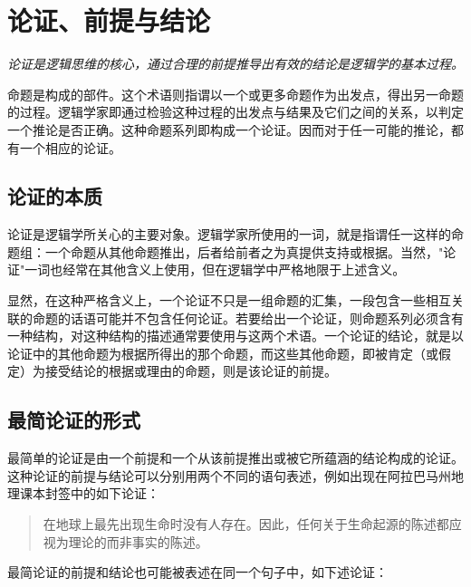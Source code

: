 \section{论证、前提与结论}

\begin{logicbox}[title=引言]
\textit{论证是逻辑思维的核心，通过合理的前提推导出有效的结论是逻辑学的基本过程。}
\end{logicbox}

命题是构成的部件。这个术语则指谓以一个或更多命题作为出发点，得出另一命题的过程。逻辑学家即通过检验这种过程的出发点与结果及它们之间的关系，以判定一个推论是否正确。这种命题系列即构成一个论证。因而对于任一可能的推论，都有一个相应的论证。

\subsection{论证的本质}

论证是逻辑学所关心的主要对象。逻辑学家所使用的一词，就是指谓任一这样的命题组：一个命题从其他命题推出，后者给前者之为真提供支持或根据。当然，"论证"一词也经常在其他含义上使用，但在逻辑学中严格地限于上述含义。

\begin{theorembox}[title=论证的结构]
显然，在这种严格含义上，一个论证不只是一组命题的汇集，一段包含一些相互关联的命题的话语可能并不包含任何论证。若要给出一个论证，则命题系列必须含有一种结构，对这种结构的描述通常要使用与这两个术语。一个论证的结论，就是以论证中的其他命题为根据所得出的那个命题，而这些其他命题，即被肯定（或假定）为接受结论的根据或理由的命题，则是该论证的前提。
\end{theorembox}

\subsection{最简论证的形式}

最简单的论证是由一个前提和一个从该前提推出或被它所蕴涵的结论构成的论证。这种论证的前提与结论可以分别用两个不同的语句表述，例如出现在阿拉巴马州地理课本封签中的如下论证：

\begin{quotation}
在地球上最先出现生命时没有人存在。因此，任何关于生命起源的陈述都应视为理论的而非事实的陈述。
\end{quotation}

最简论证的前提和结论也可能被表述在同一个句子中，如下述论证：


